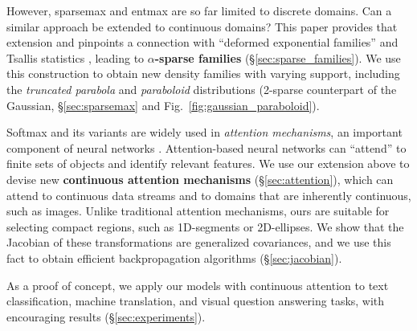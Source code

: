 \documentclass{article}
\newcommand{\remove}[1]{}
\begin{document}
However, {sparsemax} and {entmax} are so far limited to discrete domains. Can a similar approach be extended to continuous domains? This paper provides that extension and pinpoints a connection with ``deformed exponential families'' \citep{naudts2009q,sears2010generalized,ding2010t} and Tsallis statistics \citep{Tsallis1988}, leading to {\bf $\alpha$-sparse families} (\S\ref{sec:sparse_families}). 
We use this construction to obtain new density families with varying support, 
including the {\it truncated parabola} and {\it paraboloid} distributions (2-sparse counterpart of the Gaussian, \S\ref{sec:sparsemax} and Fig.~\ref{fig:gaussian_paraboloid}). 

Softmax and its variants are widely used in \textit{attention mechanisms}, an important component of neural networks \citep{bahdanau2014neural}. Attention-based neural networks can ``attend'' to finite sets of objects and identify relevant features. 
We use our extension above to devise new {\bf continuous attention mechanisms} (\S\ref{sec:attention}), which can attend to continuous data streams and to domains that are inherently continuous, such as images. Unlike traditional attention mechanisms, ours are suitable for selecting compact regions, such as 1D-segments or 2D-ellipses. We show that the Jacobian of these transformations are generalized covariances, and we use this fact to obtain efficient backpropagation algorithms (\S\ref{sec:jacobian}). 

As a proof of concept, we apply our models with continuous attention to text classification, machine translation, and visual question answering tasks, with encouraging results (\S\ref{sec:experiments}).

\remove{We also generalize the recent Fenchel-Young (FY) losses \citep{blondel2020learning} 
to arbitrary domains, illustrating their usefulness by estimating sparse continuous densities for regression problems under bounded noise \citep{d2013bounded}. We show that properties of FY losses hold for general $\alpha$-sparse families, including convexity and closed-form gradient w.r.t.\ their canonical parameters. We use this to perform interval regression, which returns mean estimates and intervals, based on the support of their distribution.} 
\end{document}
